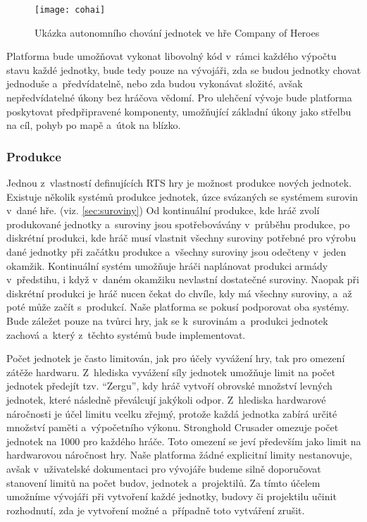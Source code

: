 \begin{figure}[h]	
	\centering
	\texttt{[image: cohai]}
	\caption{Ukázka autonomního chování jednotek ve hře Company of Heroes\citep{site:COH}}
	\label{fig:cohai}
\end{figure}

Platforma bude umožňovat vykonat libovolný kód v~rámci každého výpočtu stavu každé jednotky, bude tedy pouze na vývojáři, zda se budou jednotky chovat jednoduše a~předvídatelně, nebo zda budou vykonávat složité, avšak nepředvídatelné úkony bez hráčova vědomí. Pro ulehčení vývoje bude platforma poskytovat předpřipravené komponenty, umožňující základní úkony jako střelbu na cíl, pohyb po mapě a~útok na blízko.

\subsubsection{Produkce}

Jednou z~vlastností definujících RTS hry je možnost produkce nových jednotek. Existuje několik systémů produkce jednotek, úzce svázaných se systémem surovin v~dané hře. (viz. \ref{sec:suroviny})  Od kontinuální produkce, kde hráč zvolí produkované jednotky a~suroviny jsou spotřebovávány v~průběhu produkce, po diskrétní produkci, kde hráč musí vlastnit všechny suroviny potřebné pro výrobu dané jednotky při začátku produkce a~všechny suroviny jsou odečteny v~jeden okamžik. Kontinuální systém umožňuje hráči naplánovat produkci armády v~předstihu, i když v~daném okamžiku nevlastní dostatečné suroviny. Naopak při diskrétní produkci je hráč nucen čekat do chvíle, kdy má všechny suroviny, a~až poté může začít s~produkcí. Naše platforma se pokusí podporovat oba systémy. Bude záležet pouze na tvůrci hry, jak se k~surovinám a~produkci jednotek zachová a~který z~těchto systémů bude implementovat.

Počet jednotek je často limitován, jak pro účely vyvážení hry, tak pro omezení zátěže hardwaru. Z~hlediska vyvážení síly jednotek umožňuje limit na počet jednotek předejít tzv. ``Zergu'', kdy hráč vytvoří obrovské množství levných jednotek, které následně převálcují jakýkoli odpor. Z~hlediska hardwarové náročnosti je účel limitu vcelku zřejmý, protože každá jednotka zabírá určité množství paměti a~výpočetního výkonu. Stronghold Crusader omezuje počet jednotek na 1000 pro každého hráče. Toto omezení se jeví především jako limit na hardwarovou náročnost hry. Naše platforma žádné explicitní limity nestanovuje, avšak v~uživatelské dokumentaci pro vývojáře budeme silně doporučovat stanovení limitů na počet budov, jednotek a~projektilů. Za tímto účelem umožníme vývojáři při vytvoření každé jednotky, budovy či projektilu učinit rozhodnutí, zda je vytvoření možné a~případně toto vytváření zrušit. 

